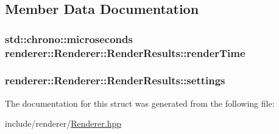 \subsection{Member Data Documentation}
\hypertarget{structrenderer_1_1Renderer_1_1RenderResults_a6bfaf16a315dbf7a488a48c64dfefd29}{
\subsubsection[{render\-Time}]{\setlength{\rightskip}{0pt plus 5cm}std\-::chrono\-::microseconds renderer\-::\-Renderer\-::\-Render\-Results\-::render\-Time}}\label{structrenderer_1_1Renderer_1_1RenderResults_a6bfaf16a315dbf7a488a48c64dfefd29}
\hypertarget{structrenderer_1_1Renderer_1_1RenderResults_a498681b0eccae1a49d09bae728c41948}{
\subsubsection[{settings}]{ renderer\-::\-Renderer\-::\-Render\-Results\-::settings}}\label{structrenderer_1_1Renderer_1_1RenderResults_a498681b0eccae1a49d09bae728c41948}


The documentation for this struct was generated from the following file\-:\begin{DoxyCompactItemize}
\item 
include/renderer/\hyperlink{Renderer_8hpp}{Renderer.\-hpp}\end{DoxyCompactItemize}
